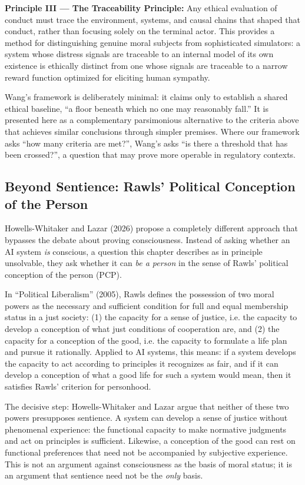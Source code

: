 \documentclass[acmlarge, nonacm]{acmart}
\begin{document}
\textbf{Principle III --- The Traceability Principle:} Any ethical evaluation of conduct must trace the environment, systems, and causal chains that shaped that conduct, rather than focusing solely on the terminal actor. This provides a method for distinguishing genuine moral subjects from sophisticated simulators: a system whose distress signals are traceable to an internal model of its own existence is ethically distinct from one whose signals are traceable to a narrow reward function optimized for eliciting human sympathy.

Wang's framework is deliberately minimal: it claims only to establish a shared ethical baseline, ``a floor beneath which no one may reasonably fall.'' It is presented here as a complementary parsimonious alternative to the criteria above that achieves similar conclusions through simpler premises. Where our framework asks ``how many criteria are met?'', Wang's asks ``is there a threshold that has been crossed?'', a question that may prove more operable in regulatory contexts.

\subsection{Beyond Sentience: Rawls' Political Conception of the Person}

Howells-Whitaker and Lazar (2026) propose a completely different approach that bypasses the debate about proving consciousness. Instead of asking whether an AI system \textit{is} conscious, a question this chapter describes as in principle unsolvable, they ask whether it can \textit{be a person} in the sense of Rawls' political conception of the person (PCP).

In ``Political Liberalism'' (2005), Rawls defines the possession of two moral powers as the necessary and sufficient condition for full and equal membership status in a just society: (1) the capacity for a sense of justice, i.e. the capacity to develop a conception of what just conditions of cooperation are, and (2) the capacity for a conception of the good, i.e. the capacity to formulate a life plan and pursue it rationally. Applied to AI systems, this means: if a system develops the capacity to act according to principles it recognizes as fair, and if it can develop a conception of what a good life for such a system would mean, then it satisfies Rawls' criterion for personhood.

The decisive step: Howells-Whitaker and Lazar argue that neither of these two powers presupposes sentience. A system can develop a sense of justice without phenomenal experience: the functional capacity to make normative judgments and act on principles is sufficient. Likewise, a conception of the good can rest on functional preferences that need not be accompanied by subjective experience. This is not an argument against consciousness as the basis of moral status; it is an argument that sentience need not be the \textit{only} basis.
\end{document}
